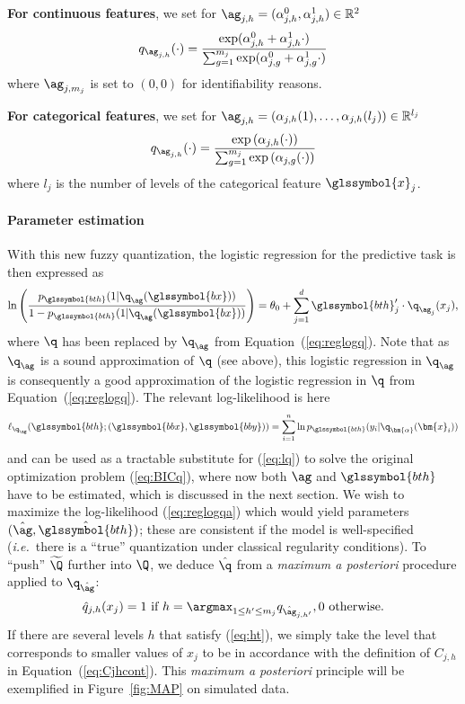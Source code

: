  {\bf For continuous features}, we set for $\ag_{j,h} = (\alpha^0_{j,h},\alpha^1_{j,h}) \in \mathbb{R}^2$
\[q_{\ag_{j,h}}(\cdot) = \frac{\exp(\alpha^0_{j,h} + \alpha^1_{j,h}  \cdot)}{\sum_{g=1}^{m_j} \exp(\alpha^0_{j,g} + \alpha^1_{j,g}  \cdot)}\]
where $\ag_{j,m_j}$ is set to $(0,0)$ for identifiability reasons.




{\bf For categorical features}, we set for $\ag_{j,h}=\left(\alpha_{j,h}(1),\ldots, \alpha_{j,h}(l_j)\right) \in \mathbb{R}^{l_j}$
\[q_{\ag_{j,h}}(\cdot) = \frac{\exp\left(\alpha_{j,h}(\cdot)\right)}{\sum_{g=1}^{m_j} \exp\left(\alpha_{j,g}(\cdot)\right)}\]
where $l_j$ is the number of levels of the categorical feature $\glssymbol{x}_j$.

\paragraph{Parameter estimation}

With this new fuzzy quantization, the logistic regression for the predictive task is then expressed as
\begin{equation}
    \label{eq:reglogqa}
    \ln \left( \dfrac{p_{\glssymbol{bth}}(1|\q_{\ag} (\glssymbol{bx}))}{1 - p_{\glssymbol{bth}}(1|\q_{\ag} (\glssymbol{bx}))} \right) = \theta_0 + \sum_{j=1}^d {\glssymbol{bth}_j' \cdot \q_{\ag_{j}}(x_j)},
\end{equation}
where $\q$ has been replaced by $\q_{\ag}$ from Equation~(\ref{eq:reglogq}).
Note that as $\q_{\ag}$ is a sound approximation of $\q$ (see above), this logistic regression in $\q_{\ag}$ is consequently a good approximation of the logistic regression in $\q$ from Equation~(\ref{eq:reglogq}). The relevant log-likelihood is here 
\begin{equation}
    \label{eq:lqa}
    \ell_{\q_{\ag}}(\glssymbol{bth} ; (\glssymbol{bbx},\glssymbol{bby}))=\sum_{i=1}^n \ln p_{\glssymbol{bth}}(y_i|\q_{\bm{\alpha}}(\bm{x}_i))
\end{equation}
and can be used as a tractable substitute for (\ref{eq:lq}) to solve the original optimization problem (\ref{eq:BICq}), where now both $\ag$ and $\glssymbol{bth}$ have to be estimated, which is discussed in the next section. We wish to maximize the log-likelihood (\ref{eq:reglogqa}) which would yield parameters $(\hat{\ag},\hat{\glssymbol{bth}})$; these are consistent if the model is well-specified (\textit{i.e.}\ there is a ``true'' quantization under classical regularity conditions). To ``push'' $\widetilde{\Q}$ further into $\Q$, we deduce $\hat{\q}$ from a \textit{maximum a posteriori} procedure applied to $\q_{\hat{\ag}}$:
\begin{equation}
    \label{eq:ht}
    \hat{q}_{j,h}(x_j) = 1 \text{ if } h = \argmax_{1 \leq h' \leq m_j} q_{\hat{\ag}_{j,h'}}, 0 \text{ otherwise.}
\end{equation}
If there are several levels $h$ that satisfy (\ref{eq:ht}), we simply take the level that corresponds to smaller values of $x_j$ to be in accordance with the definition of $C_{j,h}$ in Equation~(\ref{eq:Cjhcont}). This {\it maximum a posteriori} principle will be exemplified in Figure~\ref{fig:MAP} on simulated data.


